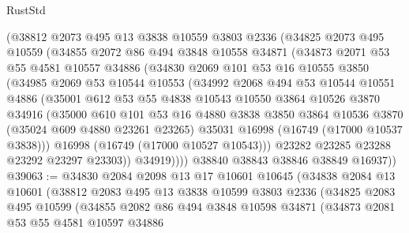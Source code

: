 \begin{lexlean}{RustStd}
\begin{coremodule}
      (@38812
        @2073
        @495
        @13
        @3838
        @10559
        @3803
        @2336
        (@34825
          @2073
          @495
          @10559
          (@34855
            @2072
            @86
            @494
            @3848
            @10558
            @34871
            (@34873
              @2071
              @53
              @55
              @4581
              @10557
              @34886
              (@34830
                @2069
                @101
                @53
                @16
                @10555
                @3850
                (@34985
                  @2069
                  @53
                  @10544
                  @10553
                  (@34992
                    @2068
                    @494
                    @53
                    @10544
                    @10551
                    @4886
                    (@35001
                      @612
                      @53
                      @55
                      @4838
                      @10543
                      @10550
                      @3864
                      @10526
                      @3870
                      @34916
                      (@35000
                        @610
                        @101
                        @53
                        @16
                        @4880
                        @3838
                        @3850
                        @3864
                        @10536
                        @3870
                        (@35024 @609 @4880 @23261 @23265)
                        @35031
                        @16998
                        (@16749 (@17000 @10537 @3838)))
                      @16998
                      (@16749 (@17000 @10527 @10543)))
                    @23282
                    @23285
                    @23288
                    @23292
                    @23297
                    @23303))
                @34919))))
        @38840
        @38843
        @38846
        @38849
        @16937))
@39063 := @34830
    @2084
    @2098
    @13
    @17
    @10601
    @10645
    (@34838
      @2084
      @13
      @10601
      (@38812
        @2083
        @495
        @13
        @3838
        @10599
        @3803
        @2336
        (@34825
          @2083
          @495
          @10599
          (@34855
            @2082
            @86
            @494
            @3848
            @10598
            @34871
            (@34873
              @2081
              @53
              @55
              @4581
              @10597
              @34886

\end{coremodule}
\end{lexlean}
